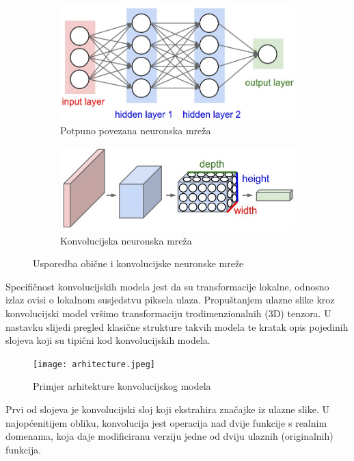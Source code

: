 \documentclass[times, utf8, diplomski]{fer}
\theoremstyle{definition}
\begin{document}
\begin{figure}[h]
\centering
\begin{subfigure}{.5\textwidth}
\centering
\includegraphics[width=\linewidth]{neural_net2.jpeg}
\caption{Potpuno povezana neuronska mreža}
\label{fig:sub1}
\end{subfigure}%
\begin{subfigure}{.5\textwidth}
\centering
\includegraphics[width=\linewidth]{cnn.jpeg}
\caption{Konvolucijska neuronska mreža}
\label{fig:sub2}
\end{subfigure}
\caption{Usporedba obične i konvolucijske neuronske mreže}
\label{fig:test}
\end{figure}

Specifičnost konvolucijskih modela jest da su transformacije lokalne, odnosno izlaz ovisi o lokalnom susjedstvu piksela ulaza. Propuštanjem ulazne slike kroz konvolucijski model vršimo transformaciju trodimenzionalnih (3D) tenzora. U nastavku slijedi pregled klasične strukture takvih modela te kratak opis pojedinih slojeva koji su tipični kod konvolucijskih modela.
\begin{figure}
\centering
\texttt{[image: arhitecture.jpeg]}
\caption{Primjer arhitekture konvolucijskog modela}
\end{figure}
\newpage Prvi od slojeva je konvolucijski sloj koji ekstrahira značajke iz ulazne slike. U najopćenitijem obliku, konvolucija jest operacija nad dvije funkcije s realnim domenama, koja daje modificiranu verziju jedne od dviju ulaznih (originalnih) funkcija.
\end{document}
